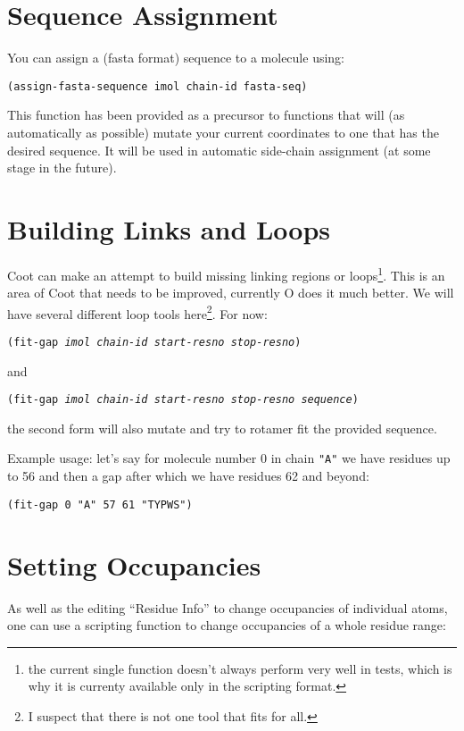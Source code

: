 \documentclass{book}
\begin{document}


\section{Sequence Assignment}
You can assign a (fasta format) sequence to a molecule using:

\texttt{(assign-fasta-sequence imol chain-id fasta-seq)}

This function has been provided as a precursor to functions that will
(as automatically as possible) mutate your current coordinates to one
that has the desired sequence. It will be used in automatic side-chain
assignment (at some stage in the future).

\section{Building Links and Loops}

Coot can make an attempt to build missing linking regions or
loops\footnote{the current single function doesn't always perform very
  well in tests, which is why it is currenty available only in the
  scripting format.}.  This is an area of Coot that needs to be
improved, currently O does it much better.  We will have several
different loop tools here\footnote{I suspect that there is not one
  tool that fits for all.}.  For now:

\texttt{(fit-gap \emph{imol} \emph{chain-id} \emph{start-resno} \emph{stop-resno})}

and 

\texttt{(fit-gap \emph{imol} \emph{chain-id} \emph{start-resno} \emph{stop-resno} \emph{sequence})}

the second form will also mutate and try to rotamer fit the provided sequence.

Example usage: let's say for molecule number 0 in chain \texttt{"A"}
we have residues up to 56 and then a gap after which we have residues
62 and beyond:

\texttt{(fit-gap 0 "A" 57 61 "TYPWS")}

\section{Setting Occupancies}
As well as the editing ``Residue Info'' to change occupancies of
individual atoms, one can use a scripting function to change
occupancies of a whole residue range:
\end{document}
